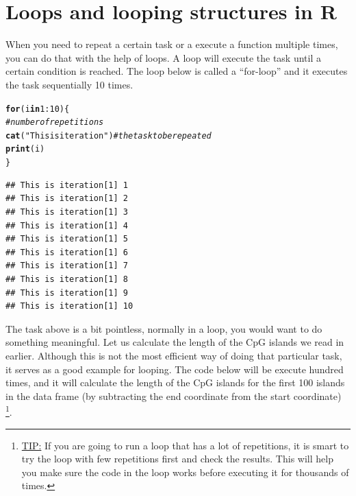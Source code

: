\documentclass[english,nohyper]{tufte-book}\usepackage[]{graphicx}\usepackage[]{color}
\makeatletter
\newcommand{\hlnum}[1]{\textcolor[rgb]{0.686,0.059,0.569}{#1}}%
\newcommand{\hlstr}[1]{\textcolor[rgb]{0.192,0.494,0.8}{#1}}%
\newcommand{\hlcom}[1]{\textcolor[rgb]{0.678,0.584,0.686}{\textit{#1}}}%
\newcommand{\hlopt}[1]{\textcolor[rgb]{0,0,0}{#1}}%
\newcommand{\hlstd}[1]{\textcolor[rgb]{0.345,0.345,0.345}{#1}}%
\newcommand{\hlkwa}[1]{\textcolor[rgb]{0.161,0.373,0.58}{\textbf{#1}}}%
\newcommand{\hlkwd}[1]{\textcolor[rgb]{0.737,0.353,0.396}{\textbf{#1}}}%
\newenvironment{kframe}{%
 \def\at@end@of@kframe{}%
 \ifinner\ifhmode%
  \def\at@end@of@kframe{\end{minipage}}%
  \begin{minipage}{\columnwidth}%
 \fi\fi%
 \def\FrameCommand##1{\hskip\@totalleftmargin \hskip-\fboxsep
 \colorbox{shadecolor}{##1}\hskip-\fboxsep
     \hskip-\linewidth \hskip-\@totalleftmargin \hskip\columnwidth}%
 \MakeFramed {\advance\hsize-\width
   \@totalleftmargin\z@ \linewidth\hsize
   \@setminipage}}%
 {\par\unskip\endMakeFramed%
 \at@end@of@kframe}
\newenvironment{knitrout}{}{} %
\makeatother
\begin{document}
\section{Loops and looping structures in R}

When you need to repeat a certain task or a execute a function multiple
times, you can do that with the help of loops. A loop will execute
the task until a certain condition is reached. The loop below is called
a ``for-loop'' and it executes the task sequentially 10 times.

\begin{knitrout}
\color{fgcolor}\begin{kframe}
\begin{alltt}
\hlkwa{for} \hlstd{(i} \hlkwa{in} \hlnum{1}\hlopt{:}\hlnum{10}\hlstd{) \{}
    \hlcom{# number of repetitions}
    \hlkwd{cat}\hlstd{(}\hlstr{"This is iteration"}\hlstd{)}  \hlcom{# the task to be repeated}
    \hlkwd{print}\hlstd{(i)}
\hlstd{\}}
\end{alltt}
\begin{verbatim}
## This is iteration[1] 1
## This is iteration[1] 2
## This is iteration[1] 3
## This is iteration[1] 4
## This is iteration[1] 5
## This is iteration[1] 6
## This is iteration[1] 7
## This is iteration[1] 8
## This is iteration[1] 9
## This is iteration[1] 10
\end{verbatim}
\end{kframe}
\end{knitrout}


The task above is a bit pointless, normally in a loop, you would want
to do something meaningful. Let us calculate the length of the CpG
islands we read in earlier. Although this is not the most efficient
way of doing that particular task, it serves as a good example for
looping. The code below will be execute hundred times, and it will
calculate the length of the CpG islands for the first 100 islands
in the data frame (by subtracting the end coordinate from the start
coordinate) %
\footnote{\uline{TIP:} If you are going to run a loop that has a lot of repetitions,
it is smart to try the loop with few repetitions first and check the
results. This will help you make sure the code in the loop works before
executing it for thousands of times.%
}.
\end{document}
